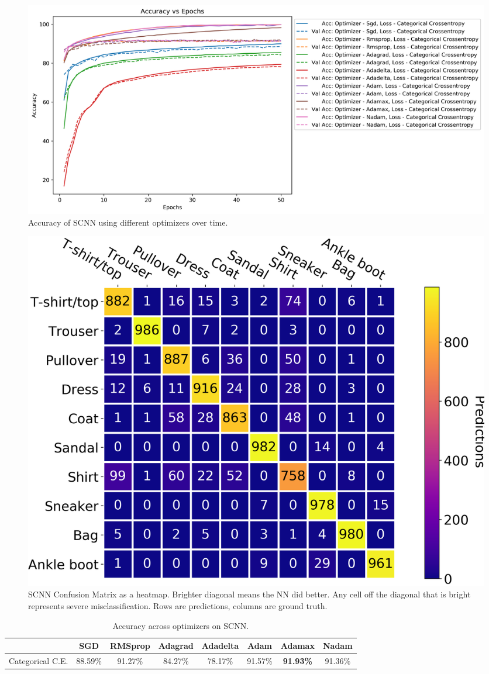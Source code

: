 \documentclass[12pt]{article}
\begin{document}
\begin{figure}
  \centering
  \includegraphics[width=\linewidth]{task_2_acc_epochs.png}
  \caption{Accuracy of SCNN using different optimizers over time.}
  \label{fig:task_2_acc_epochs}
\end{figure}

\begin{figure}
  \centering
  \includegraphics[width=\linewidth]{task_2_cm.png}
  \caption{SCNN Confusion Matrix as a heatmap. Brighter diagonal means the NN did better. Any cell off
   the diagonal that is bright represents severe misclassification. Rows are predictions, columns are ground truth.}
  \label{fig:task_2_cm}
\end{figure}

\begin{table}[]
  \centering
  \caption{Accuracy across optimizers on SCNN.}
  \label{tab:SCNN}
  \begin{tabular}{|c|c|c|c|c|c|c|c|}
  \hline
   & SGD & RMSprop & Adagrad & Adadelta & Adam & Adamax & Nadam \\ \hline
   Categorical C.E. & 88.59\% & 91.27\% & 84.27\% & 78.17\% & 91.57\% & \textbf{91.93\%} & 91.36\% \\ \hline
  \end{tabular}
  \end{table}
\end{document}
